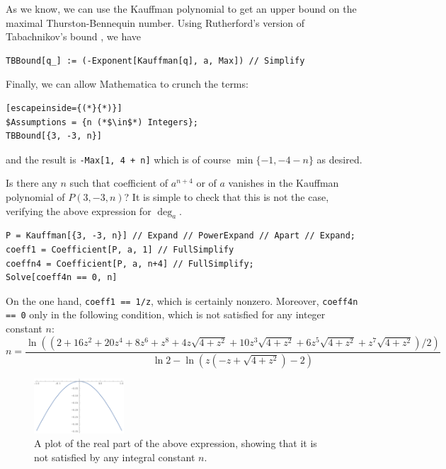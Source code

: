 As we know, we can use the Kauffman polynomial to get an upper bound on the maximal Thurston-Bennequin number. Using Rutherford's version \cite{rutherford} of Tabachnikov's bound \cite{tabachnikov}, we have

\begin{lstlisting}
TBBound[q_] := (-Exponent[Kauffman[q], a, Max]) // Simplify
\end{lstlisting}

Finally, we can allow Mathematica to crunch the terms:

\begin{lstlisting}[escapeinside={(*}{*)}]
$Assumptions = {n (*$\in$*) Integers};
TBBound[{3, -3, n}]
\end{lstlisting}

and the result is \lstinline|-Max[1, 4 + n]| which is of course $\min\{-1, -4-n\}$ as desired.

Is there any $n$ such that coefficient of $a^{n+4}$ or of $a$ vanishes in the Kauffman polynomial of $P(3, -3, n)$?
It is simple to check that this is not the case, verifying the above expression for $\deg_a$.

\begin{lstlisting}
P = Kauffman[{3, -3, n}] // Expand // PowerExpand // Apart // Expand;
coeff1 = Coefficient[P, a, 1] // FullSimplify
coeffn4 = Coefficient[P, a, n+4] // FullSimplify;
Solve[coeff4n == 0, n]
\end{lstlisting}

On the one hand, \lstinline|coeff1 == 1/z|, which is certainly nonzero. Moreover, \lstinline|coeff4n == 0| only in the following condition, which is not satisfied for any integer constant $n$:
\[
    n = \frac{ \ln\left((2 + 16 z^2 + 20 z^4 + 8 z^6 + z^8 + 4 z \sqrt{4 + z^2} + 10 z^3 \sqrt{4 + z^2} + 6 z^5 \sqrt{4 + z^2} + z^7 \sqrt{4 + z^2})/2\right)}{\ln 2 - \ln \left(z (-z + \sqrt{4 + z^2}) - 2\right)}
\]
\begin{figure}[h!]
    \centering
    \includegraphics[width=0.3\textwidth]{images/mathematica-n.pdf}
    \caption{A plot of the real part of the above expression, showing that it is not satisfied by any integral constant $n$.}
\end{figure}


